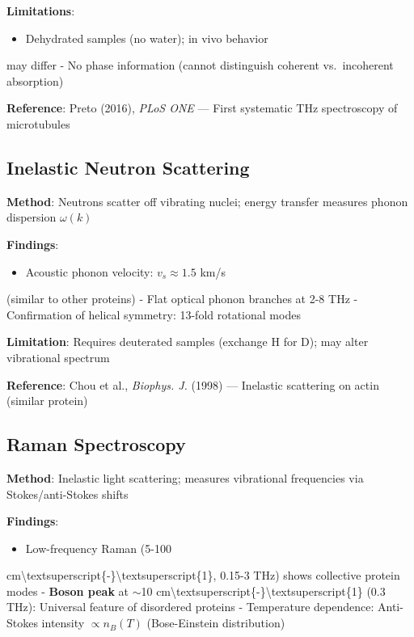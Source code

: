 \textbf{Limitations}:
\begin{itemize}
\item Dehydrated samples (no water); in vivo behavior
\end{itemize}

may differ - No phase information (cannot distinguish coherent
vs.~incoherent absorption)

\textbf{Reference}: Preto (2016), \emph{PLoS ONE} --- First
systematic THz spectroscopy of microtubules

\subsection{Inelastic Neutron Scattering}\label{inelastic-neutron-scattering-established}

\textbf{Method}: Neutrons scatter off vibrating nuclei; energy transfer
measures phonon dispersion \(\omega(k)\)

\textbf{Findings}:
\begin{itemize}
\item Acoustic phonon velocity: \(v_s \approx 1.5\) km/s
\end{itemize}

(similar to other proteins) - Flat optical phonon branches at 2-8 THz -
Confirmation of helical symmetry: 13-fold rotational modes

\textbf{Limitation}: Requires deuterated samples (exchange H for D); may
alter vibrational spectrum

\textbf{Reference}: Chou et al., \emph{Biophys. J.} (1998) ---
Inelastic scattering on actin (similar protein)

\subsection{Raman Spectroscopy}\label{raman-spectroscopy-established}

\textbf{Method}: Inelastic light scattering; measures vibrational
frequencies via Stokes/anti-Stokes shifts

\textbf{Findings}:
\begin{itemize}
\item Low-frequency Raman (5-100
\end{itemize}

cm\textbackslash textsuperscript\{-\}\textbackslash textsuperscript\{1\},
0.15-3 THz) shows collective protein modes - \textbf{Boson peak} at
$\sim$10
cm\textbackslash textsuperscript\{-\}\textbackslash textsuperscript\{1\}
(0.3 THz): Universal feature of disordered proteins - Temperature
dependence: Anti-Stokes intensity \(\propto n_B(T)\) (Bose-Einstein
distribution)

